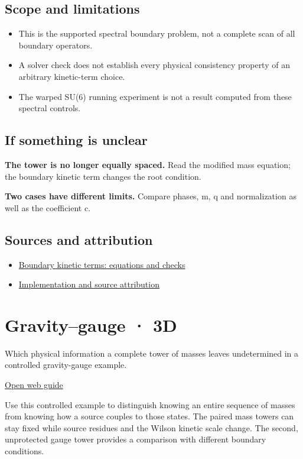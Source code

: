 \documentclass[11pt,a4paper]{article}
\begin{document}
\subsection*{Scope and limitations}
\begin{itemize}
\item This is the supported spectral boundary problem, not a complete scan of all boundary operators.
\item A solver check does not establish every physical consistency property of an arbitrary kinetic-term choice.
\item The warped SU(6) running experiment is not a result computed from these spectral controls.
\end{itemize}
\subsection*{If something is unclear}
\textbf{The tower is no longer equally spaced.} Read the modified mass equation; the boundary kinetic term changes the root condition.

\textbf{Two cases have different limits.} Compare phases, m, q and normalization as well as the coefficient c.

\subsection*{Sources and attribution}
\begin{itemize}
\item \href{https://github.com/karlesmarin/ghu-lab/blob/main/src/kernel/blkt.mjs}{Boundary kinetic terms: equations and checks}
\item \href{https://github.com/karlesmarin/ghu-lab/blob/main/src/sections/blkt_section.js}{Implementation and source attribution}
\end{itemize}
\section{Gravity--gauge · 3D}
Which physical information a complete tower of masses leaves undetermined in a controlled gravity-gauge example.

\href{https://karlesmarin.github.io/ghu-explorer/guide/gravitygauge/index.html}{Open web guide}

Use this controlled example to distinguish knowing an entire sequence of masses from knowing how a source couples to those states. The paired mass towers can stay fixed while source residues and the Wilson kinetic scale change. The second, unprotected gauge tower provides a comparison with different boundary conditions.
\end{document}
